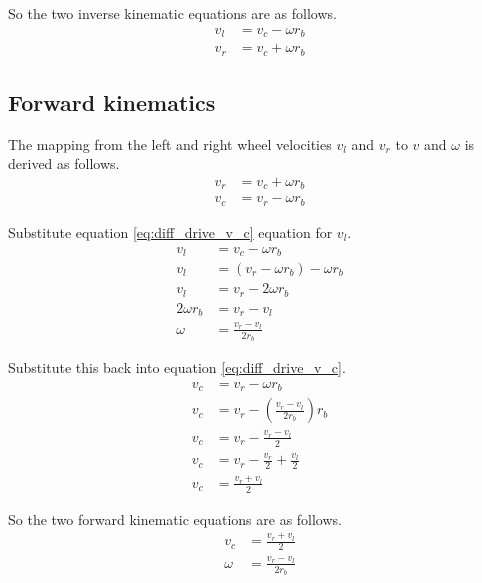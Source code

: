 So the two inverse kinematic equations are as follows.
\begin{align}
  v_l &= v_c - \omega r_b \\
  v_r &= v_c + \omega r_b
\end{align}

\subsection{Forward kinematics}

The mapping from the left and right wheel velocities $v_l$ and $v_r$ to $v$ and
$\omega$ is derived as follows.
\begin{align}
  v_r &= v_c + \omega r_b \nonumber \\
  v_c &= v_r - \omega r_b \label{eq:diff_drive_v_c}
\end{align}

Substitute equation \eqref{eq:diff_drive_v_c} equation for $v_l$.
\begin{align*}
  v_l &= v_c - \omega r_b \\
  v_l &= (v_r - \omega r_b) - \omega r_b \\
  v_l &= v_r - 2\omega r_b \\
  2\omega r_b &= v_r - v_l \\
  \omega &= \frac{v_r - v_l}{2 r_b}
\end{align*}

Substitute this back into equation \eqref{eq:diff_drive_v_c}.
\begin{align*}
  v_c &= v_r - \omega r_b \\
  v_c &= v_r - \left(\frac{v_r - v_l}{2 r_b}\right) r_b \\
  v_c &= v_r - \frac{v_r - v_l}{2} \\
  v_c &= v_r - \frac{v_r}{2} + \frac{v_l}{2} \\
  v_c &= \frac{v_r + v_l}{2}
\end{align*}

So the two forward kinematic equations are as follows.
\begin{align}
  v_c &= \frac{v_r + v_l}{2} \\
  \omega &= \frac{v_r - v_l}{2 r_b}
\end{align}
